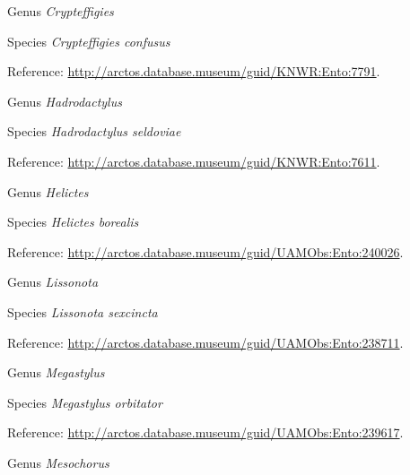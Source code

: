 \documentclass[9pt, article]{memoir}
\begin{document}
\begin{multicols}{2}
\vspace{6pt}\noindent\hspace{30pt}Genus \textit{Crypteffigies}


\vspace{6pt}\noindent\hspace{36pt}Species \textit{Crypteffigies confusus}


Reference: 
\url{http://arctos.database.museum/guid/KNWR:Ento:7791}.

\vspace{6pt}\noindent\hspace{30pt}Genus \textit{Hadrodactylus}


\vspace{6pt}\noindent\hspace{36pt}Species \textit{Hadrodactylus seldoviae}


Reference: 
\url{http://arctos.database.museum/guid/KNWR:Ento:7611}.

\vspace{6pt}\noindent\hspace{30pt}Genus \textit{Helictes}


\vspace{6pt}\noindent\hspace{36pt}Species \textit{Helictes borealis}


Reference: 
\url{http://arctos.database.museum/guid/UAMObs:Ento:240026}.

\vspace{6pt}\noindent\hspace{30pt}Genus \textit{Lissonota}


\vspace{6pt}\noindent\hspace{36pt}Species \textit{Lissonota sexcincta}


Reference: 
\url{http://arctos.database.museum/guid/UAMObs:Ento:238711}.

\vspace{6pt}\noindent\hspace{30pt}Genus \textit{Megastylus}


\vspace{6pt}\noindent\hspace{36pt}Species \textit{Megastylus orbitator}


Reference: 
\url{http://arctos.database.museum/guid/UAMObs:Ento:239617}.

\vspace{6pt}\noindent\hspace{30pt}Genus \textit{Mesochorus}



\end{multicols}
\end{document}
